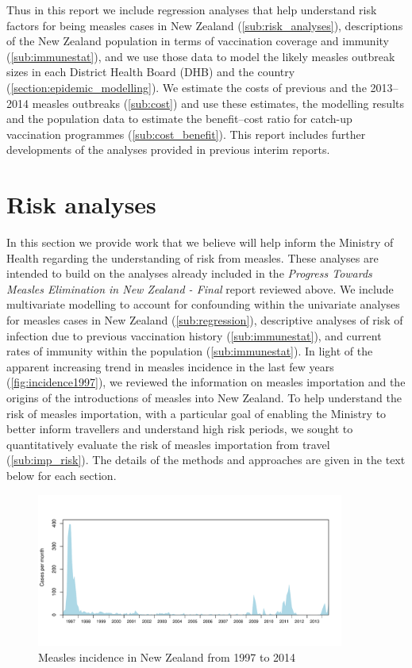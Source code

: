 \documentclass{article}
\begin{document}
Thus in this report we include regression analyses that help understand risk factors for being measles cases in New Zealand (\autoref{sub:risk_analyses}), descriptions of the New Zealand population in terms of vaccination coverage and immunity (\autoref{sub:immunestat}), and we use those data to model the likely measles outbreak sizes in each District Health Board (DHB) and the country (\autoref{section:epidemic_modelling}). We estimate the costs of previous and the 2013--2014 measles outbreaks (\autoref{sub:cost}) and use these estimates, the modelling results and the population data to estimate the benefit--cost ratio for catch-up vaccination programmes (\autoref{sub:cost_benefit}). This report includes further developments of the analyses provided in previous interim reports.

\section{Risk analyses}
\label{sub:risk_analyses}

In this section we provide work that we believe will help inform the Ministry of Health regarding the understanding of risk from measles. These analyses are intended to build on the analyses already included in the \emph {Progress Towards Measles Elimination in New Zealand - Final} report reviewed above. We include multivariate modelling to account for confounding within the univariate analyses for measles cases in New Zealand (\autoref{sub:regression}), descriptive analyses of risk of infection due to previous vaccination history (\autoref{sub:immunestat}), and current rates of immunity within the population (\autoref{sub:immunestat}). In light of the apparent increasing trend in measles incidence in the last few years (\autoref{fig:incidence1997}), we reviewed the information on measles importation and the origins of the introductions of measles into New Zealand. To help understand the risk of measles importation, with a particular goal of enabling the Ministry to better inform travellers and understand high risk periods, we sought to quantitatively evaluate the risk of measles importation from travel (\autoref{sub:imp_risk}). The details of the methods and approaches are given in the text below for each section.

\begin{figure}
     \includegraphics[width=0.9\textwidth]{incidence_1997_2014.pdf}
     \caption{Measles incidence in New Zealand from 1997 to 2014}
     \label{fig:incidence1997}
\end{figure}
\end{document}
